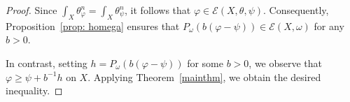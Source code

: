 \documentclass[a4paper]{amsart}
\numberwithin{equation}{section}
\theoremstyle{definition}
\newtheorem{remark}[theorem]{Remark}
\newcommand{\ddc}{dd^c}
\numberwithin{equation}{section}
\begin{document}
\begin{proof}
Since $\int_X\theta_\varphi^n=\int_X\theta_\psi^n$, it follows that $\varphi\in\mathcal{E}(X,\theta,\psi)$. Consequently, Proposition~\ref{prop: homega} ensures that $P_\omega(b(\varphi-\psi))\in\mathcal{E}(X,\omega)$ for any $b>0$.

In contrast, setting $h=P_\omega(b(\varphi-\psi))$ for some $b>0$, we observe that
$\varphi\geq \psi +b^{-1}h$ on $X$.  Applying Theorem~\ref{mainthm}, we obtain the desired inequality. 
\end{proof}

\end{document}

